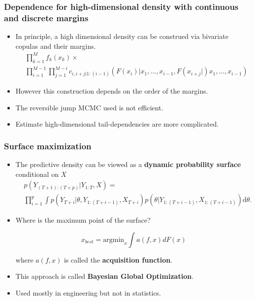 \documentclass[11pt]{beamer}
\begin{document}
\begin{frame}
  \frametitle{Dependence for high-dimensional density with continuous
    and discrete margins}
  \begin{itemize}
  \item In principle, a high dimensional density can be construed via
    bivariate copulas and their margins.
    \begin{equation*}
      \label{eq:vine}
      \begin{split}
      &\prod_{k=1}^Mf_k(x_k)\times\\ &\prod_{i=1}^{M-1}\prod_{j=1}^{M-i}c_{i,i+j|1:(i-1)}(F(x_i)|x_1,...,x_{i-1},F(x_{i+j}|)x_1,...,x_{i-1})
      \end{split}
    \end{equation*}

  \item However this construction depends on the order of the margins.

  \item The reversible jump MCMC used is not efficient.

  \item Estimate high-dimensional tail-dependencies are more
    complicated.

  \end{itemize}

\end{frame}


\begin{frame}
  \frametitle{Surface maximization}

  \begin{itemize}
  \item The predictive density can be viewed as a \textbf{dynamic
      probability surface} conditional on $X$
    \begin{equation*}
      \begin{split}
      &p(Y_{(T+1):(T+p)}|Y_{1:T},X)=\\
&\prod\limits _{i=1}^{p}\int
      p(Y_{T+i}|\theta,Y_{1:(T+i-1)}, X_{T+i})p(\theta|Y_{1:(T+i-1)},X_{{1:(T+i-1)}})\mathrm{d}\theta.
      \end{split}
\end{equation*}

\item Where is the maximum point of the surface?

\begin{equation}
\label{eq:pred}
x_{best} = \mathrm{argmin}_{x} \int a (f,x) d F(x)
\end{equation}

where $a(f,x)$ is called the \textbf{acquisition function}.

\item This approach is called \textbf{Bayesian Global Optimization}.

\item Used mostly in engineering but not in statistics.

  \end{itemize}


\end{frame}
\end{document}
